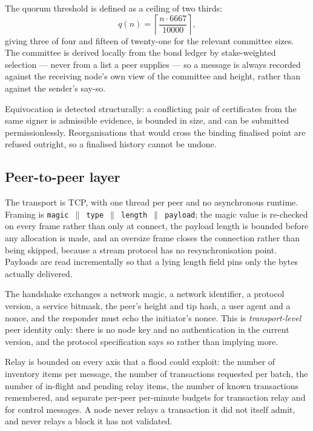 \documentclass{article}
\begin{document}
The quorum threshold is defined as a ceiling of two thirds:
\begin{equation}
q(n) = \left\lceil \frac{n \cdot 6667}{10000} \right\rceil ,
\label{eq:quorum}
\end{equation}
giving three of four and fifteen of twenty-one for the relevant committee
sizes. The committee is derived locally from the bond ledger by stake-weighted
selection --- never from a list a peer supplies --- so a message is always
recorded against the receiving node's own view of the committee and height,
rather than against the sender's say-so.

Equivocation is detected structurally: a conflicting pair of certificates from
the same signer is admissible evidence, is bounded in size, and can be
submitted permissionlessly. Reorganisations that would cross the binding
finalised point are refused outright, so a finalised history cannot be undone.

\subsection{Peer-to-peer layer}

The transport is TCP, with one thread per peer and no asynchronous runtime.
Framing is \texttt{magic $\parallel$ type $\parallel$ length $\parallel$
payload}; the magic value is re-checked on every frame rather than only at
connect, the payload length is bounded before any allocation is made, and an
oversize frame closes the connection rather than being skipped, because a
stream protocol has no resynchronisation point. Payloads are read incrementally
so that a lying length field pins only the bytes actually delivered.

The handshake exchanges a network magic, a network identifier, a protocol
version, a service bitmask, the peer's height and tip hash, a user agent and a
nonce, and the responder must echo the initiator's nonce. This is
\emph{transport-level} peer identity only: there is no node key and no
authentication in the current version, and the protocol specification says so
rather than implying more.

Relay is bounded on every axis that a flood could exploit: the number of
inventory items per message, the number of transactions requested per batch,
the number of in-flight and pending relay items, the number of known
transactions remembered, and separate per-peer per-minute budgets for
transaction relay and for control messages. A node never relays a transaction
it did not itself admit, and never relays a block it has not validated.
\end{document}
